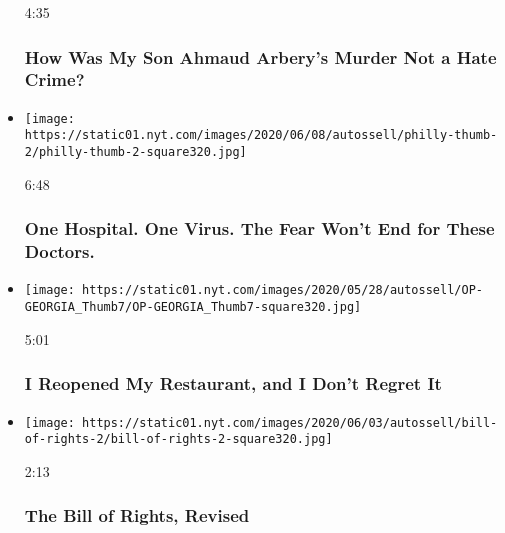 \begin{itemize}
  4:35

  \hypertarget{how-was-my-son-ahmaud-arberys-murder-not-a-hate-crime}{%
  \subsubsection{How Was My Son Ahmaud Arbery's Murder Not a Hate
  Crime?}\label{how-was-my-son-ahmaud-arberys-murder-not-a-hate-crime}}
\item
  \href{https://www.nytimes.com/video/opinion/100000007179767/coronavirus-hospital-philadelphia.html?action=click\&module=video-series-bar\&region=header\&pgtype=Article\&playlistId=video/opinion}{}

  \texttt{[image: https://static01.nyt.com/images/2020/06/08/autossell/philly-thumb-2/philly-thumb-2-square320.jpg]}

  6:48

  \hypertarget{one-hospital-one-virus-the-fear-wont-end-for-these-doctors}{%
  \subsubsection{One Hospital. One Virus. The Fear Won't End for These
  Doctors.}\label{one-hospital-one-virus-the-fear-wont-end-for-these-doctors}}
\item
  \href{https://www.nytimes.com/video/opinion/100000007161418/coronavirus-georgia-restaurant-reopening.html?action=click\&module=video-series-bar\&region=header\&pgtype=Article\&playlistId=video/opinion}{}

  \texttt{[image: https://static01.nyt.com/images/2020/05/28/autossell/OP-GEORGIA\_Thumb7/OP-GEORGIA\_Thumb7-square320.jpg]}

  5:01

  \hypertarget{i-reopened-my-restaurant-and-i-dont-regret-it}{%
  \subsubsection{I Reopened My Restaurant, and I Don't Regret
  It}\label{i-reopened-my-restaurant-and-i-dont-regret-it}}
\item
  \href{https://www.nytimes.com/video/opinion/100000007171122/protests-constitutional-rights.html?action=click\&module=video-series-bar\&region=header\&pgtype=Article\&playlistId=video/opinion}{}

  \texttt{[image: https://static01.nyt.com/images/2020/06/03/autossell/bill-of-rights-2/bill-of-rights-2-square320.jpg]}

  2:13

  \hypertarget{the-bill-of-rights-revised}{%
  \subsubsection{The Bill of Rights,
  Revised}\label{the-bill-of-rights-revised}}
\end{itemize}


